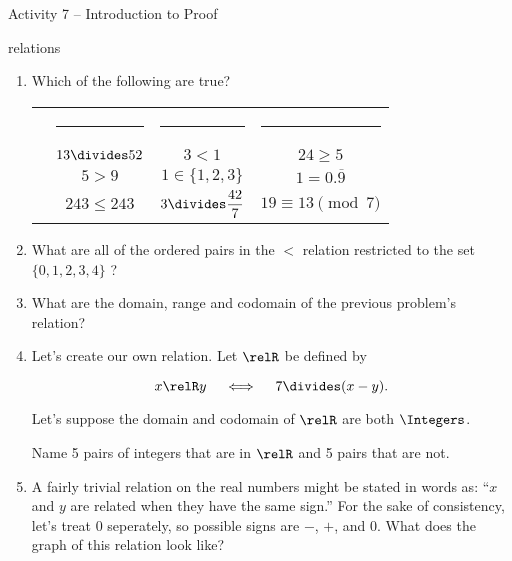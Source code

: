 \documentclass{amsart}
\begin{document}
\thispagestyle{empty}

\centerline{\Large Activity 7 -- Introduction to Proof}
\centerline{\large relations}

\bigskip
\Large


\begin{enumerate}
\item Which of the following are true?

\vspace{.1in}

\begin{tabular}{cccc}
 & \rule{72pt}{0pt} & \rule{72pt}{0pt} & \rule{72pt}{0pt} \\
\rule[-15pt]{0pt}{44pt} & $13 \divides 52$ &  $3 < 1$ & $24 \geq 5$\\
\rule[-15pt]{0pt}{44pt} & $5>9$ & $1 \in \{1,2,3\}$ & $1=0.\overline{9}$ \\
\rule[-15pt]{0pt}{44pt} & $243 \leq 243$ & $\displaystyle 3 \divides \frac{42}{7}$ & $19 \equiv 13 \pmod{7}$ \\
\end{tabular}

\rule{0pt}{0pt}

\vspace{.1in}

\rule{0pt}{0pt}

\item What are all of the ordered pairs in the $<$ relation restricted to the set $\{0,1,2,3,4\}$ ?

\vfill

\item What are the domain, range and codomain of the previous problem's relation?

\vfill

\newpage

\item Let's create our own relation.  Let $\relR$ be defined by

\[ x \relR y \quad \iff \quad 7 \divides (x-y). \]

Let's suppose the domain and codomain of $\relR$ are both $\Integers$.

Name 5 pairs of integers that are in $\relR$ and 5 pairs that are not.

\vfill

\item A fairly trivial relation on the real numbers might be stated in words as: ``$x$ and $y$ are related when they have the same sign.''  For the sake of consistency, let's treat $0$ seperately, so possible signs are $-$, $+$, and $0$.  What does the graph of this relation look like?


\end{enumerate}
\end{document}
